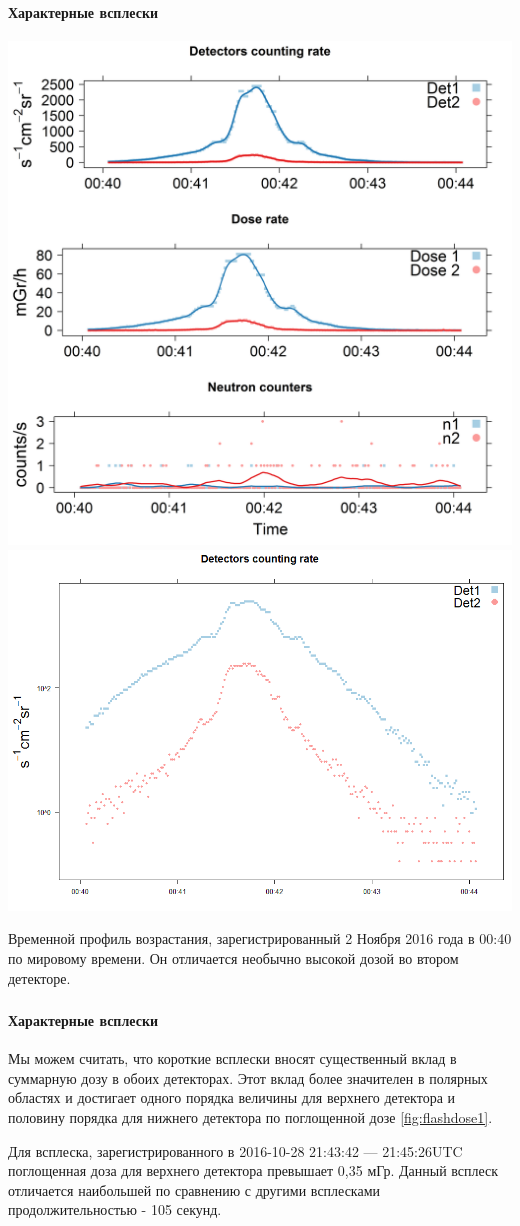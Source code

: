 \documentclass[t, aspectratio=43]{beamer}
\begin{document}
\begin{frame}	
\frametitle{\insertsection} 
\framesubtitle{Характерные всплески}


	\centering
	\includegraphics[width=0.49\linewidth]{images/depron_sec_log_new11-02-16}
	\includegraphics[width=0.49\linewidth]{images/depron_sec_log_new11-02-161}
	
	\tiny{Временной профиль возрастания, зарегистрированный 2 Ноября 2016 года в 00:40 по мировому времени. Он отличается необычно высокой дозой во втором детекторе.
	}

\end{frame}
\begin{frame}	
\frametitle{\insertsection} 
\framesubtitle{Характерные всплески}

\tiny{
	Мы можем считать, что короткие всплески вносят существенный вклад в суммарную дозу в обоих детекторах. Этот вклад более значителен в полярных областях и достигает одного порядка величины для верхнего детектора и половину порядка для нижнего детектора по поглощенной дозе \ref{fig:flashdose1}. 
	
	Для всплеска, зарегистрированного в 2016-10-28 21:43:42 --- 21:45:26UTC поглощенная доза для верхнего детектора превышает 0,35 мГр. Данный всплеск отличается наибольшей по сравнению с другими всплесками продолжительностью - 105 секунд.}


\end{frame}
\end{document}
